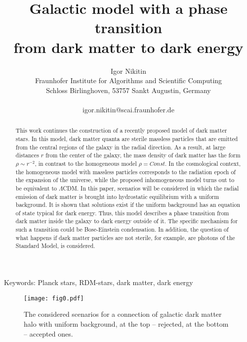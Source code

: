 \documentclass{article}
\begin{document}
\title{Galactic model with a phase transition\\ from dark matter to dark energy}
\author{Igor Nikitin\\
Fraunhofer Institute for Algorithms and Scientific Computing\\
Schloss Birlinghoven, 53757 Sankt Augustin, Germany\\
\\
igor.nikitin@scai.fraunhofer.de
}
\date{}
\maketitle

\begin{abstract}
This work continues the construction of a recently proposed model of dark matter stars. In this model, dark matter quanta are sterile massless particles that are emitted from the central regions of the galaxy in the radial direction. As a result, at large distances $r$ from the center of the galaxy, the mass density of dark matter has the form $\rho \sim r^{-2}$, in contrast to the homogeneous model $\rho=Const$. In the cosmological context, the homogeneous model with massless particles corresponds to the radiation epoch of the expansion of the universe, while the proposed inhomogeneous model turns out to be equivalent to $\Lambda$CDM. In this paper, scenarios will be considered in which the radial emission of dark matter is brought into hydrostatic equilibrium with a uniform background. It is shown that solutions exist if the uniform background has an equation of state typical for dark energy. Thus, this model describes a phase transition from dark matter inside the galaxy to dark energy outside of it. The specific mechanism for such a transition could be Bose-Einstein condensation. In addition, the question of what happens if dark matter particles are not sterile, for example, are photons of the Standard Model, is considered. 
\end{abstract}

\noindent Keywords: Planck stars, RDM-stars, dark matter, dark energy

\begin{figure}
\begin{center}
\texttt{[image: fig0.pdf]}
\end{center}
\caption{The considered scenarios for a connection of galactic dark matter halo with uniform background, at the top -- rejected, at the bottom -- accepted ones.}\label{f0}
\end{figure}
\end{document}
